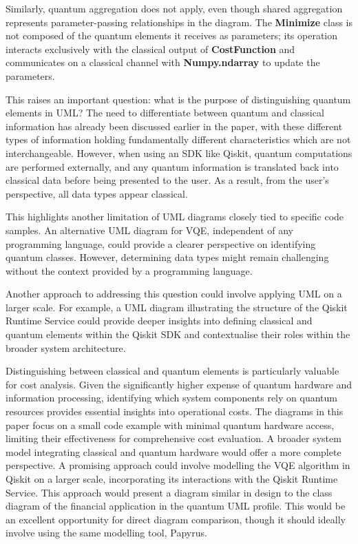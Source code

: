\documentclass{article}
\begin{document}
Similarly, quantum aggregation does not apply, even though shared aggregation represents parameter-passing relationships in the diagram. The \textbf{Minimize} class is not composed of the quantum elements it receives as parameters; its operation interacts exclusively with the classical output of \textbf{CostFunction} and communicates on a classical channel with \textbf{Numpy.ndarray} to update the parameters.

This raises an important question: what is the purpose of distinguishing quantum elements in UML? The need to differentiate between quantum and classical information has already been discussed earlier in the paper, with these different types of information holding fundamentally different characteristics which are not interchangeable. However, when using an SDK like Qiskit, quantum computations are performed externally, and any quantum information is translated back into classical data before being presented to the user. As a result, from the user’s perspective, all data types appear classical. 

This highlights another limitation of UML diagrams closely tied to specific code samples. An alternative UML diagram for VQE, independent of any programming language, could provide a clearer perspective on identifying quantum classes. However, determining data types might remain challenging without the context provided by a programming language.

Another approach to addressing this question could involve applying UML on a larger scale. For example, a UML diagram illustrating the structure of the Qiskit Runtime Service could provide deeper insights into defining classical and quantum elements within the Qiskit SDK and contextualise their roles within the broader system architecture. 

Distinguishing between classical and quantum elements is particularly valuable for cost analysis. Given the significantly higher expense of quantum hardware and information processing, identifying which system components rely on quantum resources provides essential insights into operational costs. The diagrams in this paper focus on a small code example with minimal quantum hardware access, limiting their effectiveness for comprehensive cost evaluation. A broader system model integrating classical and quantum hardware would offer a more complete perspective. A promising approach could involve modelling the VQE algorithm in Qiskit on a larger scale, incorporating its interactions with the Qiskit Runtime Service. This approach would present a diagram similar in design to the class diagram of the financial application in the quantum UML profile\cite{Pérez-Castillo2022}. This would be an excellent opportunity for direct diagram comparison, though it should ideally involve using the same modelling tool, Papyrus.
\end{document}
